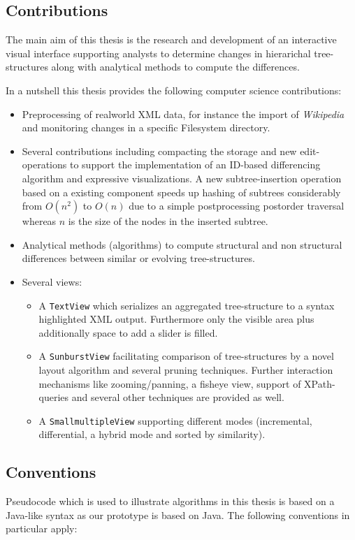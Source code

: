 \subsection{Contributions}
The main aim of this thesis is the research and development of an interactive visual interface supporting analysts to determine changes in hierarichal tree-structures along with analytical methods to compute the differences.

In a nutshell this thesis provides the following computer science contributions:

\begin{itemize}
\item Preprocessing of realworld XML data, for instance the import of \emph{Wikipedia} and monitoring changes in a specific Filesystem directory.
\item Several contributions including compacting the storage and new edit-operations to support the implementation of an ID-based differencing algorithm and expressive visualizations. A new subtree-insertion operation based on a existing component speeds up hashing of subtrees considerably from $O(n^2)$ to $O(n)$ due to a simple postprocessing postorder traversal whereas $n$ is the size of the nodes in the inserted subtree.
\item Analytical methods (algorithms) to compute structural and non structural differences between similar or evolving tree-structures.
\item Several views:
\begin{itemize}
\item A \texttt{TextView} which serializes an aggregated tree-structure to a syntax highlighted XML output. Furthermore only the visible area plus additionally space to add a slider is filled.
\item A \texttt{SunburstView} facilitating comparison of tree-structures by a novel layout algorithm and several pruning techniques. Further interaction mechanisms like zooming/panning, a fisheye view, support of XPath-queries and several other techniques are provided as well.
\item A \texttt{SmallmultipleView} supporting different modes (incremental, differential, a hybrid mode and sorted by similarity).
\end{itemize}
\end{itemize}

\subsection{Conventions}
Pseudocode which is used to illustrate algorithms in this thesis is based on a Java-like syntax as our prototype is based on Java. The following conventions in particular apply:

